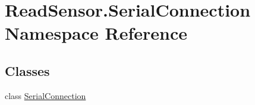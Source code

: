 \hypertarget{namespaceReadSensor_1_1SerialConnection}{}\section{Read\+Sensor.\+Serial\+Connection Namespace Reference}
\label{namespaceReadSensor_1_1SerialConnection}
\subsection*{Classes}
\begin{DoxyCompactItemize}
\item 
class \hyperlink{classReadSensor_1_1SerialConnection_1_1SerialConnection}{Serial\+Connection}
\end{DoxyCompactItemize}
